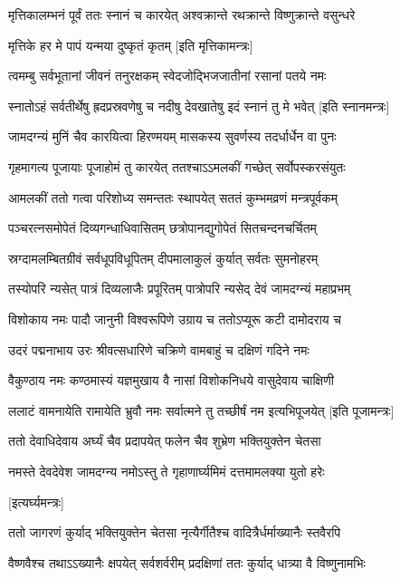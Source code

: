 \twolineshloka
{मृत्तिकालम्भनं पूर्वं ततः स्नानं च कारयेत्}
{अश्वक्रान्ते रथक्रान्ते विष्णुक्रान्ते वसुन्धरे}%

\onelineshloka
{मृत्तिके हर मे पापं यन्मया दुष्कृतं कृतम्}%
[इति मृत्तिकामन्त्रः]

\twolineshloka
{त्वमम्बु सर्वभूतानां जीवनं तनुरक्षकम्}
{स्वेदजोद्भिजजातीनां रसानां पतये नमः}%

\twolineshloka
{स्नातोऽहं सर्वतीर्थेषु ह्रदप्रस्रवणेषु च}
{नदीषु देवखातेषु इदं स्नानं तु मे भवेत्}%
[इति स्नानमन्त्रः]

\twolineshloka
{जामदग्न्यं मुनिं चैव कारयित्वा हिरण्मयम्}
{मासकस्य सुवर्णस्य तदर्धार्धेन वा पुनः}%

\twolineshloka
{गृहमागत्य पूजायाः पूजाहोमं तु कारयेत्}
{ततश्चाऽऽमलकीं गच्छेत् सर्वोपस्करसंयुतः}%

\twolineshloka
{आमलकीं ततो गत्वा परिशोध्य समन्ततः}
{स्थापयेत् सततं कुम्भमव्रणं मन्त्रपूर्वकम्}%

\twolineshloka
{पञ्चरत्नसमोपेतं दिव्यगन्धाधिवासितम्}
{छत्रोपानद्युगोपेतं सितचन्दनचर्चितम्}%

\twolineshloka
{स्रग्दामलम्बितग्रीवं सर्वधूपविधूपितम्}
{दीपमालाकुलं कुर्यात् सर्वतः सुमनोहरम्}%

\twolineshloka
{तस्योपरि न्यसेत् पात्रं दिव्यलाजैः प्रपूरितम्}
{पात्रोपरि न्यसेद् देवं जामदग्न्यं महाप्रभम्}%

\twolineshloka
{विशोकाय नमः पादौ जानुनी विश्वरूपिणे}
{उग्राय च ततोऽप्यूरू कटी दामोदराय च}%

\twolineshloka
{उदरं पद्मनाभाय उरः श्रीवत्सधारिणे}
{चक्रिणे वामबाहुं च दक्षिणं गदिने नमः}%

\twolineshloka
{वैकुण्ठाय नमः कण्ठमास्यं यज्ञमुखाय वै}
{नासां विशोकनिधये वासुदेवाय चाक्षिणी}%

\twolineshloka
{ललाटं वामनायेति रामायेति भ्रुवौ नमः}
{सर्वात्मने तु तच्छीर्षं नम इत्यभिपूजयेत्}%
[इति पूजामन्त्रः]

\twolineshloka
{ततो देवाधिदेवाय अर्घ्यं चैव प्रदापयेत्}
{फलेन चैव शुभ्रेण भक्तियुक्तेन चेतसा}%

\twolineshloka
{नमस्ते देवदेवेश जामदग्न्य नमोऽस्तु ते}
{गृहाणार्घ्यमिमं दत्तमामलक्या युतो हरेः}

[इत्यर्घ्यमन्त्रः]

\twolineshloka
{ततो जागरणं कुर्याद् भक्तियुक्तेन चेतसा}
{नृत्यैर्गीतैश्च वादित्रैर्धर्माख्यानैः स्तवैरपि}%

\twolineshloka
{वैष्णवैश्च तथाऽऽख्यानैः क्षपयेत् सर्वशर्वरीम्}
{प्रदक्षिणां ततः कुर्याद् धात्र्या वै विष्णुनामभिः}%

